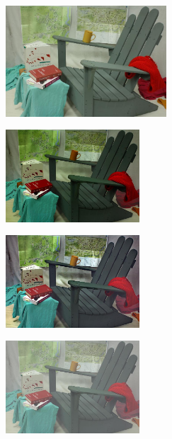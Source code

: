 \begin{figure}[htb]
\begin{subfigure}[b]{1\linewidth}
  \centering
  \centerline{\includegraphics[width=6cm]{hazerd/middlebury/ori}}
  \subcaption{}
\end{subfigure}
\vfill
\begin{subfigure}[b]{0.45\linewidth}
  \centering
  \centerline{\includegraphics[width=5cm]{hazerd/middlebury/dehaze_he}}
  \subcaption{}
\end{subfigure}
\hfill
\begin{subfigure}[b]{0.45\linewidth}
  \centering
  \centerline{\includegraphics[width=5cm]{hazerd/middlebury/dehaze_meng}}
  \subcaption{}
\end{subfigure}
\vfill
\begin{subfigure}[b]{0.45\linewidth}
  \centering
  \centerline{\includegraphics[width=5cm]{hazerd/middlebury/dehaze_zhu}}
  \subcaption{}
\end{subfigure}
\hfill
\begin{subfigure}[b]{0.45\linewidth}

\end{subfigure}
\end{figure}
